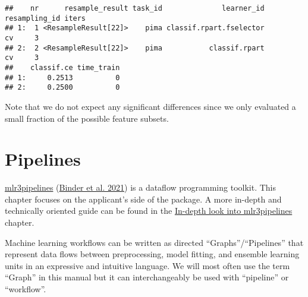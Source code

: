 \documentclass[
]{scrbook}
\newenvironment{Shaded}{\begin{snugshade}}{\end{snugshade}}
\newcommand{\AttributeTok}[1]{\textcolor[rgb]{0.77,0.63,0.00}{#1}}
\newcommand{\ConstantTok}[1]{\textcolor[rgb]{0.00,0.00,0.00}{#1}}
\newcommand{\DecValTok}[1]{\textcolor[rgb]{0.00,0.00,0.81}{#1}}
\newcommand{\FunctionTok}[1]{\textcolor[rgb]{0.00,0.00,0.00}{#1}}
\newcommand{\NormalTok}[1]{#1}
\newcommand{\OtherTok}[1]{\textcolor[rgb]{0.56,0.35,0.01}{#1}}
\newcommand{\SpecialCharTok}[1]{\textcolor[rgb]{0.00,0.00,0.00}{#1}}
\newcommand{\StringTok}[1]{\textcolor[rgb]{0.31,0.60,0.02}{#1}}
\renewenvironment{Shaded} {\begin{snugshade}\small} {\end{snugshade}}
\begin{document}
\begin{Shaded}
\end{Shaded}

\begin{verbatim}
##    nr      resample_result task_id              learner_id resampling_id iters
## 1:  1 <ResampleResult[22]>    pima classif.rpart.fselector            cv     3
## 2:  2 <ResampleResult[22]>    pima           classif.rpart            cv     3
##    classif.ce time_train
## 1:     0.2513          0
## 2:     0.2500          0
\end{verbatim}

Note that we do not expect any significant differences since we only evaluated a small fraction of the possible feature subsets.

\hypertarget{pipelines}{%
\chapter{Pipelines}\label{pipelines}}

\href{https://mlr3pipelines.mlr-org.com}{mlr3pipelines} (\protect\hyperlink{ref-mlr3pipelines}{Binder et al. 2021}) is a dataflow programming toolkit.
This chapter focuses on the applicant's side of the package.
A more in-depth and technically oriented guide can be found in the \protect\hyperlink{in-depth-pipelines}{In-depth look into mlr3pipelines} chapter.

Machine learning workflows can be written as directed ``Graphs''/``Pipelines'' that represent data flows between preprocessing, model fitting, and ensemble learning units in an expressive and intuitive language.
We will most often use the term ``Graph'' in this manual but it can interchangeably be used with ``pipeline'' or ``workflow''.
\end{document}

